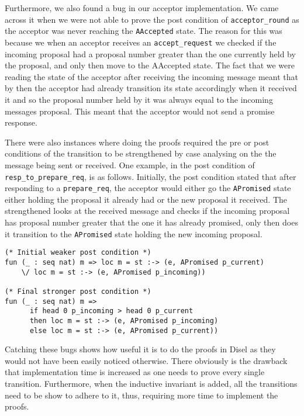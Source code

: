 Furthermore, we also found a bug in our acceptor implementation. We came
across it when we were not able to prove the post condition of \texttt{acceptor\_round}
as the acceptor was never reaching the \texttt{AAccepted} state.
The reason for this was because we when an acceptor receives an \texttt{accept\_request}
we checked if the incoming proposal had a proposal number greater than the one
currently held by the proposal, and only then move to the AAccepted state. The fact
that we were reading the state of the acceptor after receiving the incoming message
meant that by then the acceptor had already transition its state accordingly
when it received it and so the proposal number held by it was always
equal to the incoming messages proposal. This meant that the acceptor would not
send a promise response.

There were also instances where doing the proofs required the pre
or post conditions of the transition to
be strengthened by case analysing on the the message being sent or received.
One example, in the post condition of \texttt{resp\_to\_prepare\_req}, is as follows. Initially,
the post condition stated that after responding to a \texttt{prepare\_req},
the acceptor would either go the \texttt{APromised} state either holding the
proposal it already had or the new proposal it received. The strengthened
looks at the received message and checks if the incoming proposal has proposal
number greater that the one it has already promised, only then does it transition
to the \texttt{APromised} state holding the new incoming proposal.

\begin{lstlisting}
(* Initial weaker post condition *)
fun (_ : seq nat) m => loc m = st :-> (e, APromised p_current)
    \/ loc m = st :-> (e, APromised p_incoming))

(* Final stronger post condition *)
fun (_ : seq nat) m =>
      if head 0 p_incoming > head 0 p_current
      then loc m = st :-> (e, APromised p_incoming)
      else loc m = st :-> (e, APromised p_current))
\end{lstlisting}

Catching these bugs shows how useful it is to do the proofs in Disel as they
would not have been easily noticed otherwise.
There obviously is the drawback that implementation time is increased as one
needs to prove every single transition. Furthermore, when the inductive
invariant is added, all the transitions need to be show to adhere to it,
thus, requiring more time to implement the proofs.

